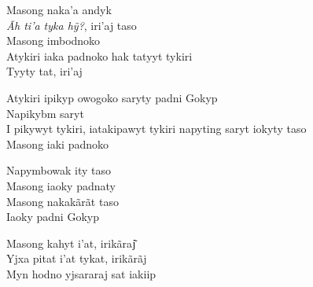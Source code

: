 \bigskip

\begin{linenumbers}
\noindent Masong naka'a andyk\\
\textit{Ãh ti'a tyka hỹ?}, iri'aj taso\\
Masong imbodnoko\\
Atykiri iaka padnoko hak tatyyt tykiri\\
Tyyty tat, iri'aj
\end{linenumbers}

\bigskip

\begin{linenumbers}
\noindent Atykiri ipikyp owogoko saryty padni Gokyp\\
Napikybm saryt\\
I pikywyt tykiri, iatakipawyt tykiri napyting saryt iokyty taso\\
Masong iaki padnoko
\end{linenumbers}

\bigskip

\begin{linenumbers}
\noindent Napymbowak ity taso\\
Masong iaoky padnaty\\
Masong nakakãrãt taso\\
Iaoky padni Gokyp
\end{linenumbers}

\bigskip

\begin{linenumbers}
\noindent Masong kahyt i'at, irikãraj͂\\
Yjxa pitat i'at tykat, irikãrãj\\
Myn hodno yjsararaj sat iakiip
\end{linenumbers}

